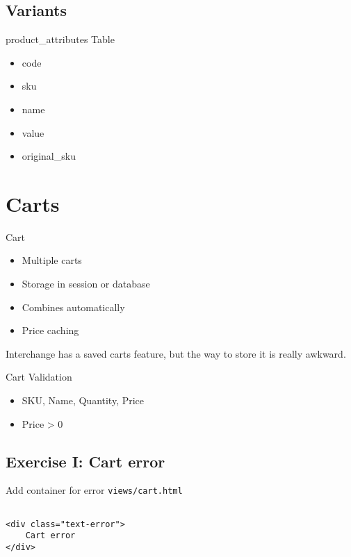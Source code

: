 \subsection{Variants}
\begin{frame}[fragile]{product\_attributes Table}
\begin{itemize}
\item code
\item sku
\item name
\item value
\item original\_sku
\end{itemize}
\end{frame}

\section{Carts}
\begin{frame}{Cart}
\begin{itemize}
\item Multiple carts
\item Storage in session or database
\item Combines automatically
\item Price caching
\end{itemize}
\end{frame}

Interchange has a saved carts feature, but the way to store it is
really awkward.

\begin{frame}{Cart Validation}
\begin{itemize}
\item SKU, Name, Quantity, Price
\item Price > 0
\end{itemize}
\end{frame}

\subsection{Exercise I: Cart error}
\begin{frame}[fragile]{Add container for error}
\verb|views/cart.html|

\begin{lstlisting}

<div class="text-error">
    Cart error
</div>
\end{lstlisting}
\end{frame}

